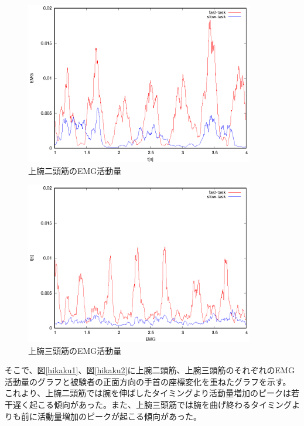 \documentclass{jsarticle}
\begin{document}
\begin{figure}[htb]
  \begin{center}
    \includegraphics[width=10cm]{kkdata1.eps}
    \caption{上腕二頭筋のEMG活動量}
    \label{kkdata1}
  \end{center}
\end{figure}


\begin{figure}[htb]
  \begin{center}
    \includegraphics[width=10cm]{kkdata2.eps}
    \caption{上腕三頭筋のEMG活動量}
    \label{kkdata2}
  \end{center}
\end{figure}


\newpage
そこで、図\ref{hikaku1}、図\ref{hikaku2}に上腕二頭筋、上腕三頭筋のそれぞれのEMG活動量のグラフと被験者の正面方向の手首の座標変化を重ねたグラフを示す。
これより、上腕二頭筋では腕を伸ばしたタイミングより活動量増加のピークは若干遅く起こる傾向があった。また、上腕三頭筋では腕を曲げ終わるタイミングよりも前に活動量増加のピークが起こる傾向があった。
\end{document}
